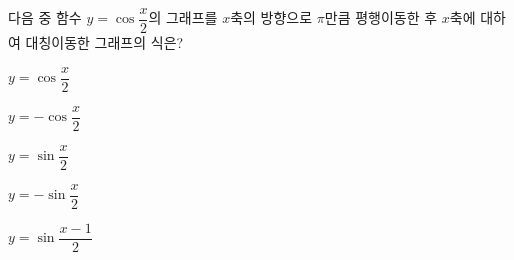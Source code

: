 다음 중 함수 $y=\cos\dfrac{x}{2}$의 그래프를 $x$축의 방향으로 $\pi$만큼 평행이동한 후 $x$축에 대하여 대칭이동한 그래프의 식은?
\begin{choices32}{\rule[-3ex]{0pt}{8ex}$y=\cos\dfrac{x}{2}$}{\rule[-3ex]{0pt}{8ex}$y=-\cos\dfrac{x}{2}$}{\rule[-3ex]{0pt}{8ex}$y=\sin\dfrac{x}{2}$}{\rule[-3ex]{0pt}{8ex}$y=-\sin\dfrac{x}{2}$}{\rule[-3ex]{0pt}{8ex}$y=\sin\dfrac{x-1}{2}$}\end{choices32}
